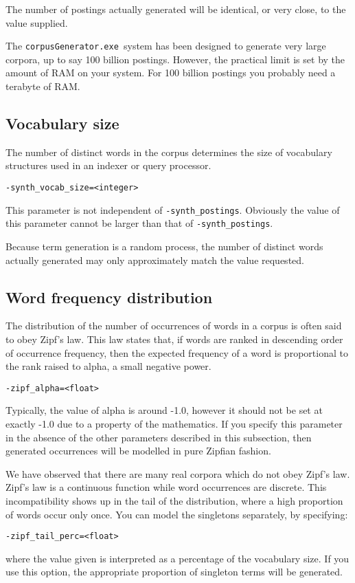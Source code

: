 \documentclass{article}
\newcommand{\gac}{\texttt{corpusGenerator.exe~}}
\begin{document}
The number of postings actually generated will be identical, or very
close, to the value supplied.

The \gac system has been designed to generate very large corpora, up to say 100
billion postings.  However, the practical limit is set by the amount
of RAM on your system.  For 100 billion postings you probably need a
terabyte of RAM.

\subsection{Vocabulary size}
The number of distinct words in the corpus determines the size of
vocabulary structures used in an indexer or query processor.
\begin{verbatim}
-synth_vocab_size=<integer>
\end{verbatim}
This parameter is not independent of \verb|-synth_postings|.  Obviously
the value of this parameter cannot be larger than that
of \verb|-synth_postings|.

Because term generation is a random process, the number of distinct
words actually generated may only approximately match the value requested.

\subsection{Word frequency distribution}
The distribution of the number of occurrences of words in a corpus is
often said to obey Zipf's law.  This law states that, if words are
ranked in descending order of occurrence frequency, then the expected
frequency of a word is proportional to the rank raised to alpha, a
small negative power.
\begin{verbatim}
-zipf_alpha=<float>
\end{verbatim}
Typically, the value of alpha is around -1.0, however it should not be
set at exactly -1.0 due to a property of the mathematics.  If you
specify this parameter in the absence of the other parameters
described in this subsection, then generated occurrences will be
modelled in pure Zipfian fashion.

We have observed that there are many real corpora which do not obey
Zipf's law.  Zipf's law is a continuous function while word
occurrences are discrete.  This incompatibility shows up in the tail
of the distribution, where a high proportion of words occur only
once.  You can model the singletons separately, by specifying:
\begin{verbatim}
-zipf_tail_perc=<float>
\end{verbatim}
where the value given is interpreted as a percentage of the vocabulary
size.  If you use this option, the appropriate proportion of singleton
terms will be generated.
\end{document}
